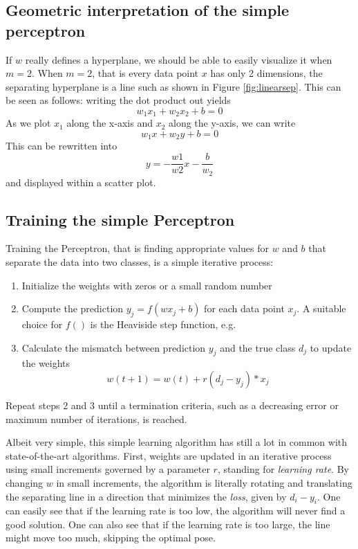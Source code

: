 \subsection{Geometric interpretation of the simple perceptron}
If $w$ really defines a hyperplane, we should be able to easily visualize it when $m=2$. When $m=2$, that is every data point $x$ has only 2 dimensions, the separating hyperplane is a line such as shown in Figure \ref{fig:linearsep}. This can be seen as follows: writing the dot product out yields
\begin{equation}
w_1x_1+w_2x_2+b=0
\end{equation}
As we plot $x_1$ along the x-axis and $x_2$ along the y-axis, we can write
\begin{equation}
w_1x+w_2y+b=0
\end{equation}
This can be rewritten into
\begin{equation}
y=-\frac{w1}{w2}x-\frac{b}{w_2}
\end{equation}
and displayed within a scatter plot.

\subsection{Training the simple Perceptron}
Training the Perceptron, that is finding appropriate values for $w$ and $b$ that separate the data into two classes, is a simple iterative process:

\begin{enumerate}
\item Initialize the weights with zeros or a small random number
\item Compute the prediction $y_j=f(wx_j+b)$ for each data point $x_j$. A suitable choice for $f()$ is the Heaviside step function, e.g.
\item Calculate the mismatch between prediction $y_j$ and the true class $d_j$ to update the weights
\begin{equation}
w(t+1)=w(t)+r(d_j-y_j)*x_j
\end{equation}
\end{enumerate}

Repeat steps 2 and 3 until a termination criteria, such as a decreasing error or maximum number of iterations, is reached.

Albeit very simple, this simple learning algorithm has still a lot in common with state-of-the-art algorithms. First, weights are updated in an iterative process using small increments governed by a parameter $r$, standing for \textsl{learning rate}. By changing $w$ in small increments, the algorithm is literally rotating and translating the separating line in a direction that minimizes the \textsl{loss}, given by $d_i-y_i$. One can easily see that if the learning rate is too low, the algorithm will never find a good solution. One can also see that if the learning rate is too large, the line might move too much, skipping the optimal pose.

